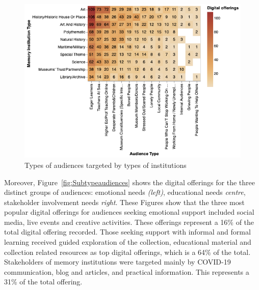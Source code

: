 \documentclass{egpubl}
\begin{document}
\begin{figure}[h]
  \centering
  \includegraphics[width=\linewidth]{images/audiencesboth.png}
  \caption{\label{fig:MTypeAudiences}
           Types of audiences targeted by types of institutions }
\end{figure}







Moreover, Figure~\ref{fig:Subtypeaudiences} shows the digital offerings for the three distinct groups of audiences: emotional needs  \emph{(left)}, educational needs \emph{centre}, stakeholder involvement needs \emph{right}. These Figures show that the three most popular digital offerings for audiences seeking emotional support included social media, live events and creative activities. These offerings represent a 16\% of the total digital offering recorded. Those seeking support with informal and formal learning received guided exploration of the collection, educational material and collection related resources as top digital offerings, which is a 64\% of the total. Stakeholders of memory institutions were targeted mainly by COVID-19 communication, blog and articles, and practical information. This represents a 31\% of the total offering.
\end{document}
